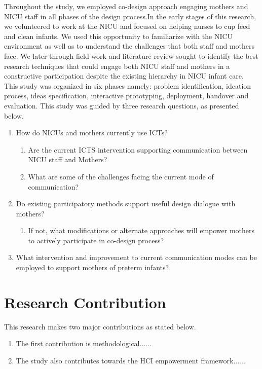 Throughout the study, we employed co-design approach engaging mothers and NICU staff in all phases of the design process.In the early stages of this research, we volunteered to work at the NICU and focused on helping nurses to cup feed and clean infants. We used this  opportunity to familiarize with the NICU environment as well as to understand the challenges that both staff and mothers face. We later through field work and literature review sought to identify the best research techniques that could engage both NICU staff and mothers in a constructive participation despite the existing hierarchy in NICU infant care. This study was organized in six phases namely: problem identification, ideation process, ideas specification, interactive prototyping, deployment, handover and evaluation. This study was guided by three research questions, as presented below.
 \begin{enumerate}
     \item How do NICUs and mothers currently use ICTs?
     \begin{enumerate}
     \item Are the current ICTS intervention supporting communication between NICU staff and Mothers?
     \item What are some of the challenges facing the current mode of communication?
      
     \end{enumerate}
     \item  Do existing participatory methods support useful design dialogue with mothers? \begin{enumerate}
     \item If not, what modifications or alternate approaches will empower mothers to actively participate in co-design process?
     \end{enumerate}
     \item What intervention and improvement to current communication modes can be employed to support mothers of preterm infants?
 \end{enumerate}

\section{Research Contribution}
This research makes two major contributions as stated below.
\begin{enumerate}
     \item The first contribution is methodological......
     \item The study also contributes towards the HCI empowerment framework......
      
     \end{enumerate}

